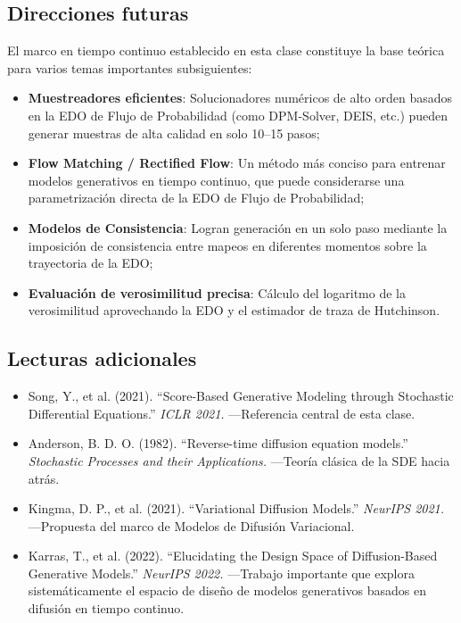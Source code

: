 \documentclass[a4paper]{article}
\begin{document}
\subsection{Direcciones futuras}

El marco en tiempo continuo establecido en esta clase constituye la base teórica para varios temas importantes subsiguientes:

\begin{itemize}
    \item \textbf{Muestreadores eficientes}: Solucionadores numéricos de alto orden basados en la EDO de Flujo de Probabilidad (como DPM-Solver, DEIS, etc.) pueden generar muestras de alta calidad en solo 10--15 pasos;
    \item \textbf{Flow Matching / Rectified Flow}: Un método más conciso para entrenar modelos generativos en tiempo continuo, que puede considerarse una parametrización directa de la EDO de Flujo de Probabilidad;
    \item \textbf{Modelos de Consistencia}: Logran generación en un solo paso mediante la imposición de consistencia entre mapeos en diferentes momentos sobre la trayectoria de la EDO;
    \item \textbf{Evaluación de verosimilitud precisa}: Cálculo del logaritmo de la verosimilitud aprovechando la EDO y el estimador de traza de Hutchinson.
\end{itemize}

\subsection{Lecturas adicionales}

\begin{itemize}
    \item Song, Y., et al. (2021). ``Score-Based Generative Modeling through Stochastic Differential Equations.'' \textit{ICLR 2021.} —Referencia central de esta clase.
    \item Anderson, B. D. O. (1982). ``Reverse-time diffusion equation models.'' \textit{Stochastic Processes and their Applications.} —Teoría clásica de la SDE hacia atrás.
    \item Kingma, D. P., et al. (2021). ``Variational Diffusion Models.'' \textit{NeurIPS 2021.} —Propuesta del marco de Modelos de Difusión Variacional.
    \item Karras, T., et al. (2022). ``Elucidating the Design Space of Diffusion-Based Generative Models.'' \textit{NeurIPS 2022.} —Trabajo importante que explora sistemáticamente el espacio de diseño de modelos generativos basados en difusión en tiempo continuo.
\end{itemize}

\end{document}
